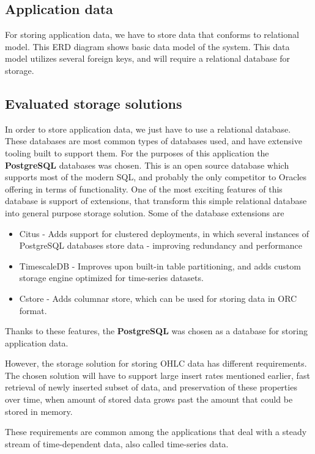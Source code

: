 \subsection{Application data}
For storing application data, we have to store data that conforms to relational model.
This ERD diagram shows basic data model of the system. This data model utilizes several foreign keys, and will require
a relational database for storage.

\subsection{Evaluated storage solutions}
In order to store application data, we just have to use a relational database. These databases are most common types of databases used,
and have extensive tooling built to support them. For the purposes of this application the \textbf{PostgreSQL} databases was chosen.
This is an open source database which supports most of the modern SQL, and probably the only competitor to Oracles offering
in terms of functionality. One of the most exciting features of this database is support of extensions, that transform
this simple relational database into general purpose storage solution. Some of the database extensions are
\begin{itemize}
    \item Citus - Adds support for clustered deployments, in which several instances of PostgreSQL databases store
    data - improving redundancy and performance
    \item TimescaleDB - Improves upon built-in table partitioning, and adds custom storage engine optimized
    for time-series datasets.
    \item Cstore - Adds columnar store, which can be used for storing data in ORC format.
\end{itemize}
Thanks to these features, the \textbf{PostgreSQL} was chosen as a database for storing application data.

However, the storage solution for storing OHLC data has different requirements. The chosen solution will have
to support large insert rates mentioned earlier, fast retrieval of newly inserted subset of data, and preservation
of these properties over time, when amount of stored data grows past the amount that could be stored in memory.

These requirements are common among the applications that deal with a steady stream of time-dependent data, also called
time-series data.

